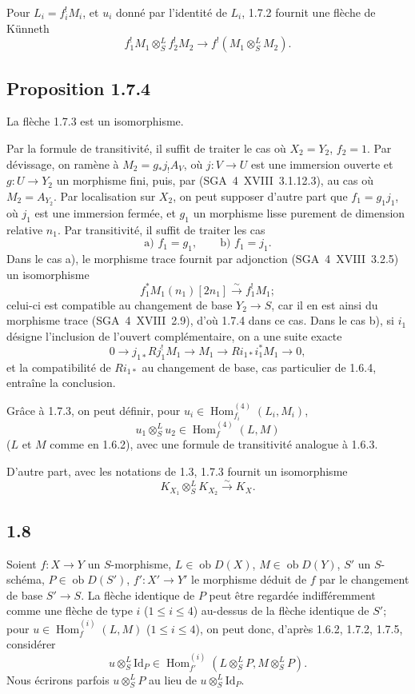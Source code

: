 \documentclass[11pt]{article}
\DeclareMathOperator{\Hom}{Hom}
\newcommand{\ob}{\operatorname{ob}}
\providecommand{\Id}{\mathrm{Id}}
\providecommand{\Hom}{\operatorname{Hom}}
\providecommand{\ob}{\operatorname{ob}}
\begin{document}
Pour $L_i=f_i^{!}M_i$, et $u_i$ donné par l'identité de $L_i$, 1.7.2 fournit une flèche de Künneth
\begin{equation}\tag{1.7.3}
f_1^{!}M_1\otimes^{L}_{S}f_2^{!}M_2\longrightarrow f^{!}(M_1\otimes^{L}_{S}M_2).
\end{equation}

\subsection*{Proposition 1.7.4}
La flèche 1.7.3 est un isomorphisme.

Par la formule de transitivité, il suffit de traiter le cas où $X_2=Y_2$, $f_2=1$. Par dévissage, on ramène à $M_2=g_{*}j_{!}A_V$, où $j:V\to U$ est une immersion ouverte et $g:U\to Y_2$ un morphisme fini, puis, par (SGA~4~XVIII~3.1.12.3), au cas où $M_2=A_{Y_2}$. Par localisation sur $X_2$, on peut supposer d'autre part que $f_1=g_1j_1$, où $j_1$ est une immersion fermée, et $g_1$ un morphisme lisse purement de dimension relative $n_1$. Par transitivité, il suffit de traiter les cas
\[
\text{a) } f_1=g_1,\qquad \text{b) } f_1=j_1.
\]
Dans le cas a), le morphisme trace fournit par adjonction (SGA~4~XVIII~3.2.5) un isomorphisme
\[
f_1^{*}M_1(n_1)[2n_1]\xrightarrow{\sim}f_1^{!}M_1;
\]
celui-ci est compatible au changement de base $Y_2\to S$, car il en est ainsi du morphisme trace (SGA~4~XVIII~2.9), d'où 1.7.4 dans ce cas. Dans le cas b), si $i_1$ désigne l'inclusion de l'ouvert complémentaire, on a une suite exacte
\[
0\longrightarrow j_{1*}Rj_1^{!}M_1\longrightarrow M_1\longrightarrow Ri_{1*}i_1^{*}M_1\longrightarrow0,
\]
et la compatibilité de $Ri_{1*}$ au changement de base, cas particulier de 1.6.4, entraîne la conclusion.

Grâce à 1.7.3, on peut définir, pour $u_i\in\Hom_{f_i}^{(4)}(L_i,M_i)$,
\begin{equation}\tag{1.7.5}
u_1\otimes^{L}_{S}u_2\in\Hom_f^{(4)}(L,M)
\end{equation}
($L$ et $M$ comme en 1.6.2), avec une formule de transitivité analogue à 1.6.3.

D'autre part, avec les notations de 1.3, 1.7.3 fournit un isomorphisme
\begin{equation}\tag{1.7.6}
K_{X_1}\otimes^{L}_{S}K_{X_2}\xrightarrow{\sim}K_X.
\end{equation}

\subsection*{1.8}
Soient $f:X\to Y$ un $S$-morphisme, $L\in\ob D(X)$, $M\in\ob D(Y)$, $S'$ un $S$-schéma, $P\in\ob D(S')$, $f':X'\to Y'$ le morphisme déduit de $f$ par le changement de base $S'\to S$. La flèche identique de $P$ peut être regardée indifféremment comme une flèche de type $i$ ($1\leq i\leq4$) au-dessus de la flèche identique de $S'$; pour $u\in\Hom_f^{(i)}(L,M)$ ($1\leq i\leq4$), on peut donc, d'après 1.6.2, 1.7.2, 1.7.5, considérer
\begin{equation}\tag{1.8.1}
u\otimes^{L}_{S}\Id_P\in\Hom_{f'}^{(i)}(L\otimes^{L}_{S}P,M\otimes^{L}_{S}P).
\end{equation}
Nous écrirons parfois $u\otimes^{L}_{S}P$ au lieu de $u\otimes^{L}_{S}\Id_P$.
\end{document}

